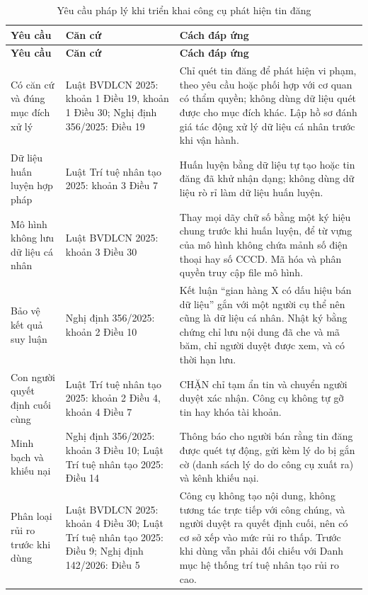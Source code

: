 {\small{}
\begin{xltabular}{\textwidth}{>{\hsize\raggedright\arraybackslash}X>{\hsize\raggedright\arraybackslash}X>{\hsize\raggedright\arraybackslash}X}
\caption{Yêu cầu pháp lý khi triển khai công cụ phát hiện tin đăng}\label{tab:5.tuanthu}\\
\toprule
\textbf{Yêu cầu} & \textbf{Căn cứ} & \textbf{Cách đáp ứng} \\
\midrule
\endfirsthead
\toprule
\textbf{Yêu cầu} & \textbf{Căn cứ} & \textbf{Cách đáp ứng} \\
\midrule
\endhead
\bottomrule
\endlastfoot
Có căn cứ và đúng mục đích xử lý & Luật BVDLCN 2025: khoản 1 Điều 19, khoản 1 Điều 30; Nghị định 356/2025: Điều 19 & Chỉ quét tin đăng để phát hiện vi phạm, theo yêu cầu hoặc phối hợp với cơ quan có thẩm quyền; không dùng dữ liệu quét được cho mục đích khác. Lập hồ sơ đánh giá tác động xử lý dữ liệu cá nhân trước khi vận hành. \\
Dữ liệu huấn luyện hợp pháp & Luật Trí tuệ nhân tạo 2025: khoản 3 Điều 7 & Huấn luyện bằng dữ liệu tự tạo hoặc tin đăng đã khử nhận dạng; không dùng dữ liệu rò rỉ làm dữ liệu huấn luyện. \\
Mô hình không lưu dữ liệu cá nhân & Luật BVDLCN 2025: khoản 3 Điều 30 & Thay mọi dãy chữ số bằng một ký hiệu chung trước khi huấn luyện, để từ vựng của mô hình không chứa mảnh số điện thoại hay số CCCD. Mã hóa và phân quyền truy cập file mô hình. \\
Bảo vệ kết quả suy luận & Nghị định 356/2025: khoản 2 Điều 10 & Kết luận “gian hàng X có dấu hiệu bán dữ liệu” gắn với một người cụ thể nên cũng là dữ liệu cá nhân. Nhật ký bằng chứng chỉ lưu nội dung đã che và mã băm, chỉ người duyệt được xem, và có thời hạn lưu. \\
Con người quyết định cuối cùng & Luật Trí tuệ nhân tạo 2025: khoản 2 Điều 4, khoản 4 Điều 7 & CHẶN chỉ tạm ẩn tin và chuyển người duyệt xác nhận. Công cụ không tự gỡ tin hay khóa tài khoản. \\
Minh bạch và khiếu nại & Nghị định 356/2025: khoản 3 Điều 10; Luật Trí tuệ nhân tạo 2025: Điều 14 & Thông báo cho người bán rằng tin đăng được quét tự động, gửi kèm lý do bị gắn cờ (danh sách lý do do công cụ xuất ra) và kênh khiếu nại. \\
Phân loại rủi ro trước khi dùng & Luật BVDLCN 2025: khoản 4 Điều 30; Luật Trí tuệ nhân tạo 2025: Điều 9; Nghị định 142/2026: Điều 5 & Công cụ không tạo nội dung, không tương tác trực tiếp với công chúng, và người duyệt ra quyết định cuối, nên có cơ sở xếp vào mức rủi ro thấp. Trước khi dùng vẫn phải đối chiếu với Danh mục hệ thống trí tuệ nhân tạo rủi ro cao. \\
\end{xltabular}}


